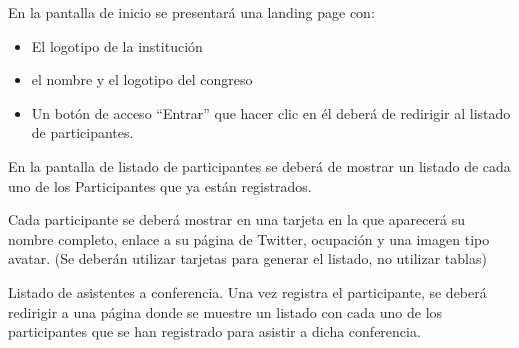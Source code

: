 \begin{list}{RNF\_\IncReq\thecRequerimientos}{}
	\item En la pantalla de inicio se presentará una landing page con:
	\begin{itemize}
		\item El logotipo de la institución
		\item el nombre y el logotipo del congreso
		\item Un botón de acceso ``Entrar'' que hacer clic en él deberá de redirigir al listado de participantes.
	\end{itemize}
	
	\item En la pantalla de listado de participantes se deberá de mostrar un listado de cada uno de los Participantes que ya están registrados. 
	
	Cada participante se deberá mostrar en una tarjeta en la que aparecerá su nombre completo, enlace a su página de Twitter, ocupación y una imagen tipo avatar.
	(Se deberán utilizar tarjetas para generar el listado, no utilizar tablas)
	
	\item Listado de asistentes a conferencia. Una vez registra el participante, se deberá redirigir a una página donde se muestre un listado con cada uno de los participantes que se han registrado para asistir a dicha conferencia.
\end{list}